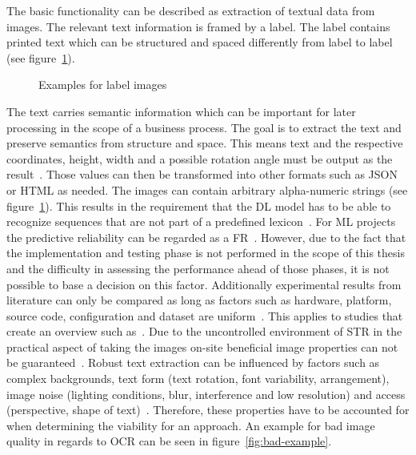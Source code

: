 The basic functionality can be described as extraction of textual data from images.
The relevant text information is framed by a label.
The label contains printed text which can be structured and spaced differently from label to
label (see figure~\ref{fig:examples}).
\begin{figure}
    \centering
    \caption{Examples for label images\label{fig:examples}}
\end{figure}
The text carries semantic information which can be important for later processing in the scope of
a business process.
The goal is to extract the text and preserve semantics from structure and space.
This means text and the respective coordinates, height, width and a possible rotation angle must
be output as the result~\cite{yang_learning_2021}.
Those values can then be transformed into other formats such as JSON or HTML as needed.
The images can contain arbitrary alpha-numeric strings (see figure~\ref{fig:examples}).
This results in the requirement that the \ac{DL} model has to be able to recognize sequences that
are not part of a predefined lexicon~\cite{ghosh_visual_2017}.
For \ac{ML} projects the predictive reliability can be regarded as a
\ac{FR}~\cite{vogelsang_requirements_2019}.
However, due to the fact that the implementation and testing phase is not performed in the scope of
this thesis and the difficulty in assessing the performance ahead of those phases, it is not
possible to base a decision on this factor.
Additionally experimental results from literature can only be compared as long as factors such as
hardware, platform, source code, configuration and dataset are uniform~\cite{arpteg_software_2018}.
This applies to studies that create an overview such as~\cite{chen_text_2021,long_scene_2021}.
Due to the uncontrolled environment of \ac{STR} in the practical aspect of taking the images on-site
beneficial image properties can not be guaranteed~\cite{chen_text_2021}.
Robust text extraction can be influenced by factors such as complex backgrounds, text form
(text rotation, font variability, arrangement), image noise (lighting conditions, blur,
interference and low resolution) and access (perspective, shape of
text)~\cite{oyedotun_deep_2015,ghosh_visual_2017,chen_text_2021}.
Therefore, these properties have to be accounted for when determining the viability for an approach.
An example for bad image quality in regards to \ac{OCR} can be seen in figure~\ref{fig:bad-example}.


